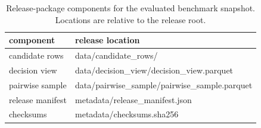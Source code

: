 \begin{table}[t]
  \centering
  \footnotesize
  \caption{Release-package components for the evaluated benchmark snapshot. Locations are relative to the release root.}
  \label{tab:artifact-layout}
  \begin{tabularx}{\columnwidth}{@{}P{0.31\columnwidth}L@{}}
    \toprule
    component & release location \\
    \midrule
    candidate rows & data/candidate\_rows/ \\
    decision view & data/decision\_view/decision\_view.parquet \\
    pairwise sample & data/pairwise\_sample/pairwise\_sample.parquet \\
    release manifest & metadata/release\_manifest.json \\
    checksums & metadata/checksums.sha256 \\
    \bottomrule
  \end{tabularx}
\end{table}
